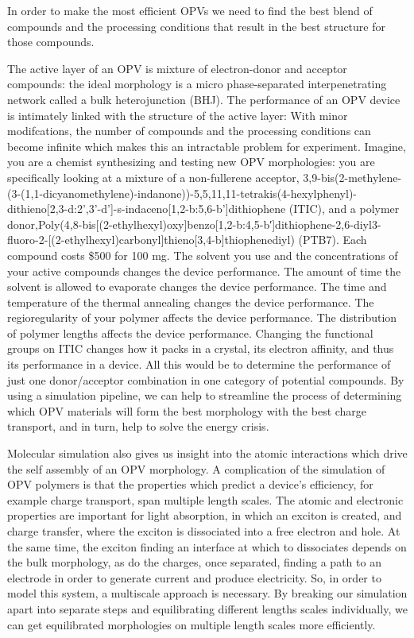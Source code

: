 In order to make the most efficient OPVs we need to find the best blend of compounds and the processing conditions that result in the best structure for those compounds.

The active layer of an OPV is mixture of electron-donor and acceptor compounds: the ideal morphology is a micro phase-separated interpenetrating network called a bulk heterojunction (BHJ).
The performance of an OPV device is intimately linked with the structure of the active layer:
With minor modifcations, the number of compounds and the processing conditions can become infinite which makes this an intractable problem for experiment.
Imagine, you are a chemist synthesizing and testing new OPV morphologies: you are specifically looking at a mixture of a non-fullerene acceptor, 3,9-bis(2-methylene-(3-(1,1-dicyanomethylene)-indanone))-5,5,11,11-tetrakis(4-hexylphenyl)-dithieno[2,3-d:2’,3’-d’]-s-indaceno[1,2-b:5,6-b’]dithiophene (ITIC), and a polymer donor,Poly({4,8-bis[(2-ethylhexyl)oxy]benzo[1,2-b:4,5-b′]dithiophene-2,6-diyl}{3-fluoro-2-[(2-ethylhexyl)carbonyl]thieno[3,4-b]thiophenediyl}) (PTB7). 
Each compound costs \$500 for 100 mg\cite{sigmaaldrich}.
The solvent you use and the concentrations of your active compounds changes the device performance\cite{Hoppe2004a}.
The amount of time the solvent is allowed to evaporate changes the device performance\cite{Li2007}.
The time and temperature of the thermal annealing changes the device performance\cite{Ma2005}.
The regioregularity of your polymer affects the device performance\cite{Kim2006}.
The distribution of polymer lengths affects the device performance\cite{Zhao2013b}.
Changing the functional groups on ITIC changes how it packs in a crystal, its electron affinity, and thus its performance in a device\cite{Swick2019a}.
All this would be to determine the performance of just one donor/acceptor combination in one category of potential compounds\cite{Dou2013}.
By using a simulation pipeline, we can help to streamline the process of determining which OPV materials will form the best morphology with the best charge transport, and in turn, help to solve the energy crisis.

Molecular simulation also gives us insight into the atomic interactions which drive the self assembly of an OPV morphology.
A complication of the simulation of OPV polymers is that the properties which predict a device's efficiency, for example charge transport, span multiple length scales.
The atomic and electronic properties are important for light absorption, in which an exciton is created, and charge transfer, where the exciton is dissociated into a free electron and hole\cite{Scharber2006a,Hoppe2004,Mazzio2015}.
At the same time, the exciton finding an interface at which to dissociates depends on the bulk morphology, as do the charges, once separated, finding a path to an electrode in order to generate current and produce electricity.
So, in order to model this system, a multiscale approach is necessary.
By breaking our simulation apart into separate steps and equilibrating different lengths scales individually, we can get equilibrated morphologies on multiple length scales more efficiently.

